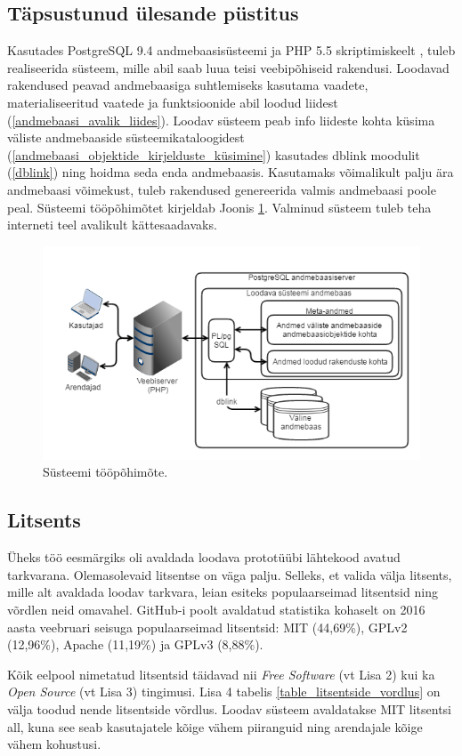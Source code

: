 \documentclass[a4paper,12pt]{article} %
\begin{document}
\subsection{Täpsustunud ülesande püstitus}
Kasutades PostgreSQL 9.4 andmebaasisüsteemi \cite{PostgreSQL} ja PHP 5.5 skriptimiskeelt \cite{PHP}, tuleb realiseerida süsteem, mille abil saab luua teisi veebipõhiseid rakendusi. Loodavad rakendused peavad andmebaasiga suhtlemiseks kasutama vaadete, materialiseeritud vaatede ja funktsioonide abil loodud liidest (\ref{andmebaasi_avalik_liides}). Loodav süsteem peab info liideste kohta küsima väliste andmebaaside süsteemikataloogidest (\ref{andmebaasi_objektide_kirjelduste_küsimine}) kasutades dblink moodulit (\ref{dblink}) ning hoidma seda enda andmebaasis. Kasutamaks võimalikult palju ära andmebaasi võimekust, tuleb rakendused genereerida valmis andmebaasi poole peal. Süsteemi tööpõhimõtet kirjeldab Joonis \ref{fig_süsteemi_tööpõhimõte}. Valminud süsteem tuleb teha interneti teel avalikult kättesaadavaks.

\begin{figure}[H]
\centering
\includegraphics[width=\textwidth]{./diagrams/how-should-pgapex-work.png}
\caption{Süsteemi tööpõhimõte.}
\label{fig_süsteemi_tööpõhimõte}
\end{figure}

\subsection{Litsents}
Üheks töö eesmärgiks oli avaldada loodava prototüübi lähtekood avatud tarkvarana. Olemasolevaid litsentse on väga palju. Selleks, et valida välja litsents, mille alt avaldada loodav tarkvara, leian esiteks populaarseimad litsentsid ning võrdlen neid omavahel.
GitHub-i poolt avaldatud statistika kohaselt on 2016 aasta veebruari seisuga populaarseimad litsentsid: MIT (44,69\%), GPLv2 (12,96\%), Apache (11,19\%) ja GPLv3 (8,88\%). \cite{GitHub_Opensource_Licence_Usage}\par
Kõik eelpool nimetatud litsentsid täidavad nii \textit{Free Software} (vt Lisa 2) kui ka \textit{Open Source} (vt Lisa 3) tingimusi. Lisa 4 tabelis \ref{table_litsentside_vordlus} on välja toodud nende litsentside võrdlus.
Loodav süsteem avaldatakse MIT litsentsi all, kuna see seab kasutajatele kõige vähem piiranguid ning arendajale kõige vähem kohustusi.
\end{document}
